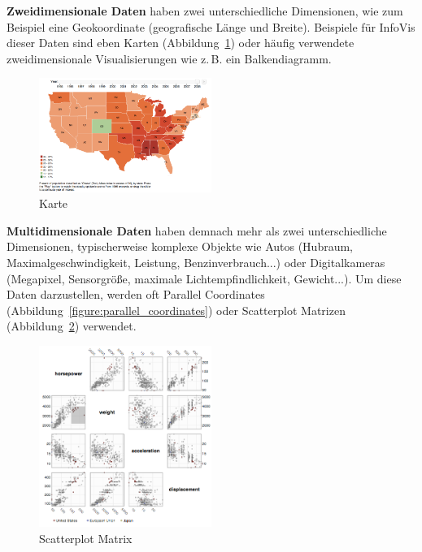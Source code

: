 \documentclass[
	headsepline,
	footsepline,
	fontsize=12pt,
	bibliography=totoc
]{scrbook}
\begin{document}
\textbf{Zweidimensionale Daten} haben zwei unterschiedliche Dimensionen, wie zum Beispiel eine Geokoordinate (geografische Länge und Breite). Beispiele für InfoVis dieser Daten sind eben Karten (Abbildung~\ref{figure:karte}) oder häufig verwendete zweidimensionale Visualisierungen wie z.\,B. ein Balkendiagramm.

\begin{figure}[htbp]
   \centering
   \includegraphics[width=0.5\textwidth]{images/grundlagen-karte.png}
   \caption{Karte}
   \label{figure:karte}
\end{figure}

\textbf{Multidimensionale Daten} haben demnach mehr als zwei unterschiedliche Dimensionen, typischerweise komplexe Objekte wie Autos (Hubraum, Maximalgeschwindigkeit, Leistung, Benzinverbrauch...) oder Digitalkameras (Megapixel, Sensorgröße, maximale Lichtempfindlichkeit, Gewicht...). Um diese Daten darzustellen, werden oft Parallel Coordinates (Abbildung~\ref{figure:parallel_coordinates}) oder Scatterplot Matrizen (Abbildung~\ref{figure:scatterplot_matrix}) verwendet.

\begin{figure}[htbp]
   \centering
   \includegraphics[width=0.5\textwidth]{images/grundlagen-scatterplot_matrix.png}
   \caption{Scatterplot Matrix}
   \label{figure:scatterplot_matrix}
\end{figure}
\end{document}

